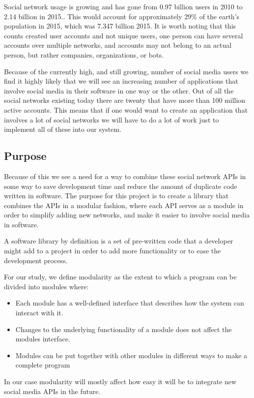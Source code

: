 \documentclass{sigchi-alternate}
\begin{document}
Social network usage is growing and has gone from 0.97 billion users in 2010 to 2.14 billion in 2015.\autocite{STATISTA_SN_WORLD_USERS}. This would
account for approximately 29\% of the earth's population in 2015, which was 7.347 billion 2015\autocite{WORLD_BANK_POPULATION}. It is worth noting
that this counts created user accounts and not unique users, one person can have several accounts over multiple networks, and accounts may not
belong to an actual person, but rather companies, organizations, or bots.

Because of the currently high, and still growing, number of social media users we find it highly likely that we will see an increasing number of
applications that involve social media in their software in one way or the other. Out of all the social networks existing today there are twenty
that have more than 100 million active accounts\autocite{STATISTA_LEADING_SOCIAL_NETWORKS}. This means that if one would want to create an application
that involves a lot of social networks we will have to do a lot of work just to implement all of these into our system.

\subsection{Purpose}
Because of this we see a need for a way to combine these social network APIs in some way to save development
time and reduce the amount of duplicate code written in software. The purpose for this project is to create a library 
that combines the APIs in a modular fashion, where each API serves as a module in order to simplify adding new networks,
and make it easier to involve social media in software. 

A software library by definition is a set of pre-written code that a developer might add to a project in order to add more functionality or to ease the 
development process\autocite{TLDP_LIBRARY_DEFINITION}. 

For our study, we define modularity as the extent to which a program can be divided into modules where\autocite{Kiczales:2005:APM:1062455.1062482}:
\begin{itemize}
	\item Each module has a well-defined interface that describes how the system can interact with it.
	\item Changes to the underlying functionality of a module does not affect the modules interface.
	\item Modules can be put together with other modules in different ways to make a complete program
\end{itemize}
In our case modularity will mostly affect how easy it will be to integrate new social media APIs in the future.
\end{document}
